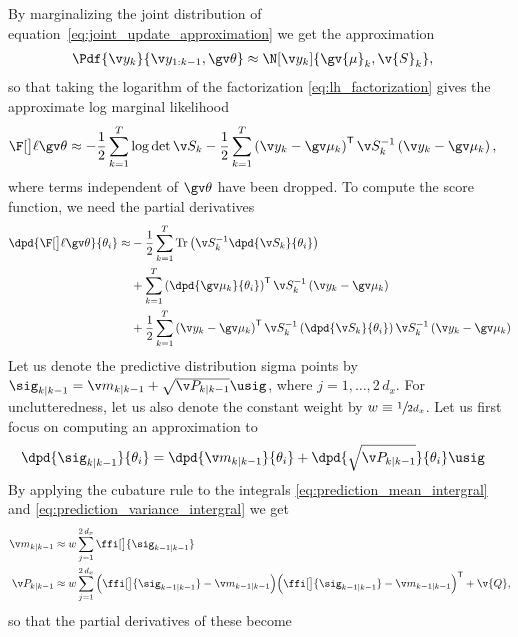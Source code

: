 By marginalizing the joint distribution of equation~\eqref{eq:joint_update_approximation}
we get the approximation
\begin{align}
	\Pdf{\y_k}{\y_{1:k-1},\Th}&\approx \N[\yk]{\gv{\mu}_k,\v{S}_k} ,
\end{align}
so that taking the logarithm of the factorization \eqref{eq:lh_factorization} 
gives the approximate log marginal likelihood 
\begin{align}
	\lLH&\approx
	-\frac{1}{2}\sum_{k=1}^T\log\det{\S}
	-\frac{1}{2}\sum_{k=1}^T
	\left(\yk-\ym\right)^\tr
	\S^{-1}
	\left(\yk-\ym\right),
	\label{eq:nonl_logLH}
\end{align}
where terms independent of $\Th$ have been dropped.
To compute the score function, we need the partial derivatives
\begin{align}
\begin{split}
	\dpd{\lLH}{\theta_i}
	\approx&-\frac{1}{2}\sum_{k=1}^T
	\mathrm{Tr}\left(\S^{-1}\dpd{\S}{\theta_i}\right)\\
	&+\sum_{k=1}^T
	\left(\dpd{\ym}{\theta_i}\right)^\tr\S^{-1}\left(\yk-\ym\right)\\
	&+\frac{1}{2}\sum_{k=1}^T
	\left(\yk-\ym\right)^\tr\S^{-1}\left(\dpd{\S}{\theta_i}\right)\S^{-1}\left(\yk-\ym\right)\\
	\label{eq:nonl_dlogLH}
\end{split}
\end{align}
%
%
Let us denote the predictive distribution sigma points by 
$\sig_{k|k-1}=\m_{k|k-1}+\sqrt{\P_{k|k-1}}\usig$, where $j=1,\dots,2\,d_x$.
For unclutteredness, let us also denote the constant
weight by $w\equiv \sfrac{1}{2d_x}$. Let us first focus on computing
an approximation to 
\begin{align}
	\dpd{\sig_{k|k-1}}{\theta_i}&= \dpd{\m_{k|k-1}}{\theta_i}+ \dpd{\sqrt{\P_{k|k-1}}}{\theta_i}\usig
	\label{eq:dSig_pred}
\end{align}
By applying the cubature rule to the integrals \eqref{eq:prediction_mean_intergral} and 
\eqref{eq:prediction_variance_intergral} 
we get   
%
\begin{align}
	\m_{k|k-1} &\approx{} w \sum_{j=1}^{2\,d_x} \ffi[\big]{\sig_{k-1|k-1}} \\
	\P_{k|k-1} &\approx{} w \sum_{j=1}^{2\,d_x}%
	\Big(\ffi[\big]{\sig_{k-1|k-1}}-\m_{k-1|k-1}\Big)%
	\Big(\ffi[\big]{\sig_{k-1|k-1}}-\m_{k-1|k-1}\Big)^\tr%
	+\v{Q},
	\label{tablelabel}
\end{align}
so that the partial derivatives of these become
